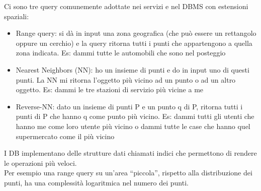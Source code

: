 Ci sono tre query comunemente adottate nei servizi e nel DBMS con 
estensioni spaziali:
\begin{itemize}
    \item Range query: si dà in input una zona geografica (che può essere un rettangolo oppure un cerchio) e la query ritorna tutti i punti che appartengono a quella zona indicata. Es: dammi tutte le automobili che sono nel posteggio
    \item Nearest Neighbors (NN): ho un insieme di punti e do in input uno di questi punti. La NN mi ritorna l'oggetto più vicino ad un punto o ad un altro oggetto. Es: dammi le tre stazioni di servizio più vicine a me
    \item Reverse-NN: dato un insieme di punti P e un punto q di P,  ritorna tutti i punti di P che hanno q come punto più vicino. Es: dammi tutti gli utenti che hanno me come loro utente più vicino o dammi tutte le case che hanno quel supermercato come il più vicino
\end{itemize}

I DB implementano delle strutture dati chiamati indici che permettono di rendere le operazioni più veloci. 
\\ Per esempio una range query su un’area “piccola”, rispetto alla distribuzione dei punti, ha una complessità logaritmica nel numero dei punti.




